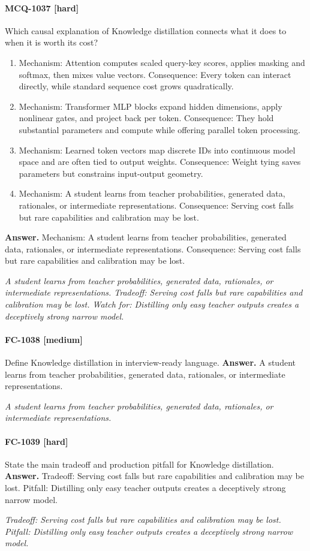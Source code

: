 \paragraph{MCQ-1037 [hard]} Which causal explanation of Knowledge distillation connects what it does to when it is worth its cost?
\begin{enumerate}[label=\Alph*.]
\item Mechanism: Attention computes scaled query-key scores, applies masking and softmax, then mixes value vectors. Consequence: Every token can interact directly, while standard sequence cost grows quadratically.
\item Mechanism: Transformer MLP blocks expand hidden dimensions, apply nonlinear gates, and project back per token. Consequence: They hold substantial parameters and compute while offering parallel token processing.
\item Mechanism: Learned token vectors map discrete IDs into continuous model space and are often tied to output weights. Consequence: Weight tying saves parameters but constrains input-output geometry.
\item Mechanism: A student learns from teacher probabilities, generated data, rationales, or intermediate representations. Consequence: Serving cost falls but rare capabilities and calibration may be lost.
\end{enumerate}
\noindent\textbf{Answer.} Mechanism: A student learns from teacher probabilities, generated data, rationales, or intermediate representations. Consequence: Serving cost falls but rare capabilities and calibration may be lost.
\par\textit{A student learns from teacher probabilities, generated data, rationales, or intermediate representations. Tradeoff: Serving cost falls but rare capabilities and calibration may be lost. Watch for: Distilling only easy teacher outputs creates a deceptively strong narrow model.}
\paragraph{FC-1038 [medium]} Define Knowledge distillation in interview-ready language.
\noindent\textbf{Answer.} A student learns from teacher probabilities, generated data, rationales, or intermediate representations.
\par\textit{A student learns from teacher probabilities, generated data, rationales, or intermediate representations.}
\paragraph{FC-1039 [hard]} State the main tradeoff and production pitfall for Knowledge distillation.
\noindent\textbf{Answer.} Tradeoff: Serving cost falls but rare capabilities and calibration may be lost. Pitfall: Distilling only easy teacher outputs creates a deceptively strong narrow model.
\par\textit{Tradeoff: Serving cost falls but rare capabilities and calibration may be lost. Pitfall: Distilling only easy teacher outputs creates a deceptively strong narrow model.}
